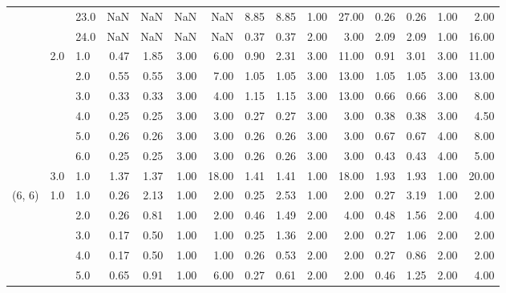 \begin{tabular}{lllrrrrrrrrrrrr}
       &     & 23.0 &        NaN &       NaN &  NaN &    NaN &       8.85 &      8.85 &  1.00 &  27.00 &       0.26 &      0.26 &  1.00 &   2.00 \\
       &     & 24.0 &        NaN &       NaN &  NaN &    NaN &       0.37 &      0.37 &  2.00 &   3.00 &       2.09 &      2.09 &  1.00 &  16.00 \\
       & 2.0 & 1.0  &       0.47 &      1.85 & 3.00 &   6.00 &       0.90 &      2.31 &  3.00 &  11.00 &       0.91 &      3.01 &  3.00 &  11.00 \\
       &     & 2.0  &       0.55 &      0.55 & 3.00 &   7.00 &       1.05 &      1.05 &  3.00 &  13.00 &       1.05 &      1.05 &  3.00 &  13.00 \\
       &     & 3.0  &       0.33 &      0.33 & 3.00 &   4.00 &       1.15 &      1.15 &  3.00 &  13.00 &       0.66 &      0.66 &  3.00 &   8.00 \\
       &     & 4.0  &       0.25 &      0.25 & 3.00 &   3.00 &       0.27 &      0.27 &  3.00 &   3.00 &       0.38 &      0.38 &  3.00 &   4.50 \\
       &     & 5.0  &       0.26 &      0.26 & 3.00 &   3.00 &       0.26 &      0.26 &  3.00 &   3.00 &       0.67 &      0.67 &  4.00 &   8.00 \\
       &     & 6.0  &       0.25 &      0.25 & 3.00 &   3.00 &       0.26 &      0.26 &  3.00 &   3.00 &       0.43 &      0.43 &  4.00 &   5.00 \\
       & 3.0 & 1.0  &       1.37 &      1.37 & 1.00 &  18.00 &       1.41 &      1.41 &  1.00 &  18.00 &       1.93 &      1.93 &  1.00 &  20.00 \\
(6, 6) & 1.0 & 1.0  &       0.26 &      2.13 & 1.00 &   2.00 &       0.25 &      2.53 &  1.00 &   2.00 &       0.27 &      3.19 &  1.00 &   2.00 \\
       &     & 2.0  &       0.26 &      0.81 & 1.00 &   2.00 &       0.46 &      1.49 &  2.00 &   4.00 &       0.48 &      1.56 &  2.00 &   4.00 \\
       &     & 3.0  &       0.17 &      0.50 & 1.00 &   1.00 &       0.25 &      1.36 &  2.00 &   2.00 &       0.27 &      1.06 &  2.00 &   2.00 \\
       &     & 4.0  &       0.17 &      0.50 & 1.00 &   1.00 &       0.26 &      0.53 &  2.00 &   2.00 &       0.27 &      0.86 &  2.00 &   2.00 \\
       &     & 5.0  &       0.65 &      0.91 & 1.00 &   6.00 &       0.27 &      0.61 &  2.00 &   2.00 &       0.46 &      1.25 &  2.00 &   4.00 \\

\end{tabular}
